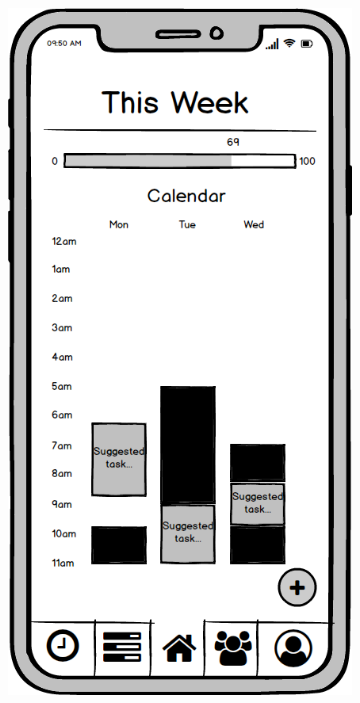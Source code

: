 \begin{figure}
    \centering
    \begin{subfigure}[b]{0.3\textwidth}
        \centering
        \includegraphics[width=\textwidth]{./graphics/design/Dashboard (This Week Calendar View).png}

\end{subfigure}
\end{figure}
